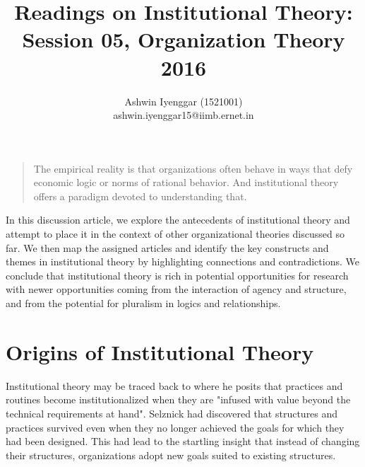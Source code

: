 \documentclass[12pt]{article}
\begin{document}
\title{Readings on Institutional Theory:\\  Session 05, Organization Theory 2016}
\author{Ashwin Iyenggar  (1521001) \\ ashwin.iyenggar15@iimb.ernet.in} 


\maketitle
\thispagestyle{empty}


\begin{quotation}  
The empirical reality is that organizations often behave in ways that defy economic logic or norms of rational behavior. And institutional theory offers a paradigm devoted to understanding that.\\
\null\hfill \textit{\cite{Suddaby2010}}
\end{quotation}

\abstract
In this discussion article, we explore the antecedents of institutional theory and attempt to place it in the context of other organizational theories discussed so far. We then map the assigned articles and identify the key constructs and themes in institutional theory by highlighting connections and contradictions. We conclude that institutional theory is rich in potential opportunities for research with newer opportunities coming from the interaction of agency and structure, and from the potential for pluralism in logics and relationships.

\section{Origins of Institutional Theory}
Institutional theory may be traced back to  \cite{Selznick1957} where he posits that practices and routines become institutionalized when they are "infused with value beyond the technical requirements at hand". Selznick had discovered that structures and practices survived even when they no longer achieved the goals for which they had been designed. This had lead to the startling insight that instead of changing their structures, organizations adopt new goals suited to existing structures.
\end{document}
